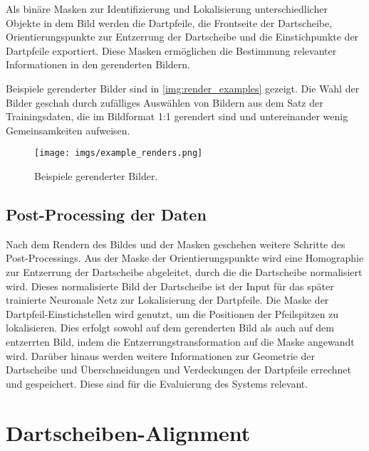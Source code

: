 Als binäre Masken zur Identifizierung und Lokalisierung unterschiedlicher Objekte in dem Bild werden die Dartpfeile, die Frontseite der Dartscheibe, Orientierungspunkte zur Entzerrung der Dartscheibe und die Einstichpunkte der Dartpfeile exportiert. Diese Masken ermöglichen die Bestimmung relevanter Informationen in den gerenderten Bildern.

Beispiele gerenderter Bilder sind in \autoref{img:render_examples} gezeigt. Die Wahl der Bilder geschah durch zufälliges Auswählen von Bildern aus dem Satz der Trainingsdaten, die im Bildformat 1:1 gerendert sind und untereinander wenig Gemeinsamkeiten aufweisen.

\begin{figure}
    \centering
    \texttt{[image: imgs/example\_renders.png]}
    \caption{Beispiele gerenderter Bilder.}
    \label{img:render_examples}
\end{figure}

\subsection{Post-Processing der Daten}
\label{sec:impl:daten:postprocess}

Nach dem Rendern des Bildes und der Masken geschehen weitere Schritte des Post-Processings. Aus der Maske der Orientierungspunkte wird eine Homographie zur Entzerrung der Dartscheibe abgeleitet, durch die die Dartscheibe normalisiert wird. Dieses normalisierte Bild der Dartscheibe ist der Input für das später trainierte Neuronale Netz zur Lokalisierung der Dartpfeile. Die Maske der Dartpfeil-Einstichstellen wird genutzt, um die Positionen der Pfeilspitzen zu lokalisieren. Dies erfolgt sowohl auf dem gerenderten Bild als auch auf dem entzerrten Bild, indem die Entzerrungstransformation auf die Maske angewandt wird. Darüber hinaus werden weitere Informationen zur Geometrie der Dartscheibe und Überschneidungen und Verdeckungen der Dartpfeile errechnet und gespeichert. Diese sind für die Evaluierung des Systems relevant.


\section{Dartscheiben-Alignment}
\label{sec:impl:cv}

